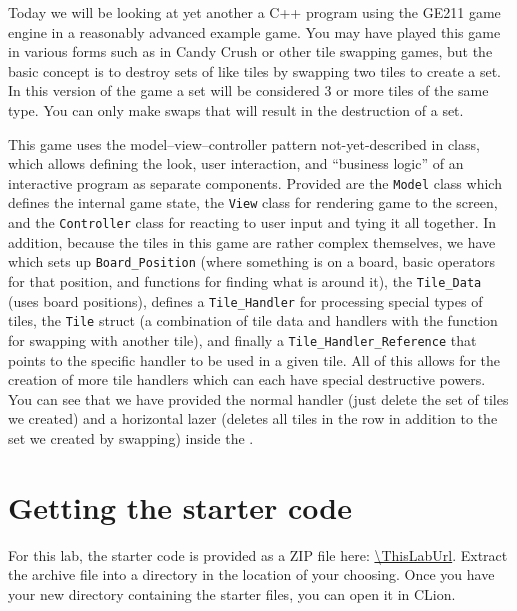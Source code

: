 \documentclass{tufte-handout}
\begin{document}
\maketitle

Today we will be looking at yet another a C++ program using the GE211 game
engine in a reasonably advanced example game. You may have played this game
in various forms such as in Candy Crush or other tile swapping games, but the
basic concept is to destroy sets of like tiles by swapping two tiles to
create a set. In this version of the game a set will be considered 3 or more
tiles of the same type. You can only make swaps that will result in the
destruction of a set.

This game uses the model--view--controller pattern not-yet-described in
class, which allows defining the look, user interaction, and ``business
logic'' of an interactive program as separate components. Provided are
the \texttt{Model} class which defines the internal game state, the
\texttt{View} class for rendering game to the screen, and the
\texttt{Controller} class for reacting to user input and tying it all
together. In addition, because the tiles in this game are rather complex
themselves, we have  which sets up \texttt{Board\_Position}
(where something is on a board, basic operators for that position, and
functions for finding what is around it), the \texttt{Tile\_Data} (uses board
positions), defines a \texttt{Tile\_Handler} for processing special types of
tiles, the \texttt{Tile} struct (a combination of tile data and handlers with
the function for swapping with another tile), and finally a
\texttt{Tile\_Handler\_Reference} that points to the specific handler to be
used in a given tile. All of this allows for the creation of more tile handlers
which can each have special destructive powers. You can see that we have provided
the normal handler (just delete the set of tiles we created) and a horizontal
lazer (deletes all tiles in the row in addition to the set we created by swapping)
inside the .

\section{Getting the starter code}

For this lab, the starter code is provided as a ZIP file here:
\url{\ThisLabUrl}. Extract the archive file into a directory in the
location of your choosing. Once you have your new directory containing
the starter files, you can open it in CLion.
\end{document}
